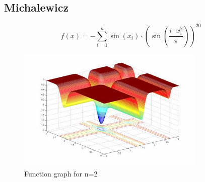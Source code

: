 \documentclass{article}
\begin{document}
\clearpage
\subsection{Michalewicz}

{\Large %
\[
f(x) = -\sum_{i=1}^{n} \sin(x_i) \cdot \left( \sin\left(\frac{i \cdot x_i^2}{\pi}\right) \right)^{20}
\]

\begin{figure}[h]
    \centering
    \includegraphics[width=0.8\textwidth]{michalewicz.jpg} 
    \caption{Function graph for n=2 \cite{Michalewicz}}
    \label{fig:rastrigin-image}
\end{figure}

}
\end{document}
